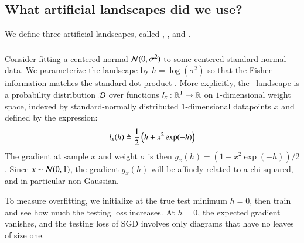 
    \subsection{What artificial landscapes did we use?}             \label{appendix:artificial}

        We define three artificial landscapes, called
        \Gauss, \Helix, and \MeanEstimation.

        \subsubsection{\Gauss}
            Consider fitting a centered normal $\mathcal{N}(0, \sigma^2)$ to some
            centered standard normal data.  We parameterize the landscape by
            $h=\log(\sigma^2)$ so that the Fisher information matches the
            standard dot product \citep{am98}.   
            More explicitly, the \Gauss\, landscape is a probability
            distribution $\mathcal{D}$ over functions $l_x:\mathbb{R}^1\to \mathbb{R}$ on
            $1$-dimensional weight space, indexed by standard-normally
            distributed $1$-dimensional datapoints $x$ and defined by the
            expression:
            $$
                l_x(h)
                \triangleq
                \frac{1}{2} \left(h + x^2 \exp(-h)\right)
            $$
            The gradient at sample $x$ and weight $\sigma$ is then $g_x(h) =
            (1-x^2\exp(-h))/2$.  Since $x\sim \mathcal{N}(0, 1)$, the gradient $g_x(h)$
            will be affinely related to a chi-squared, and in particular
            non-Gaussian.
            
            To measure overfitting, we initialize at the true test minimum
            $h=0$, then train and see how much the testing loss increases.  At
            $h=0$, the expected gradient vanishes, and the testing loss of SGD
            involves only diagrams that have no leaves of size one.
            
